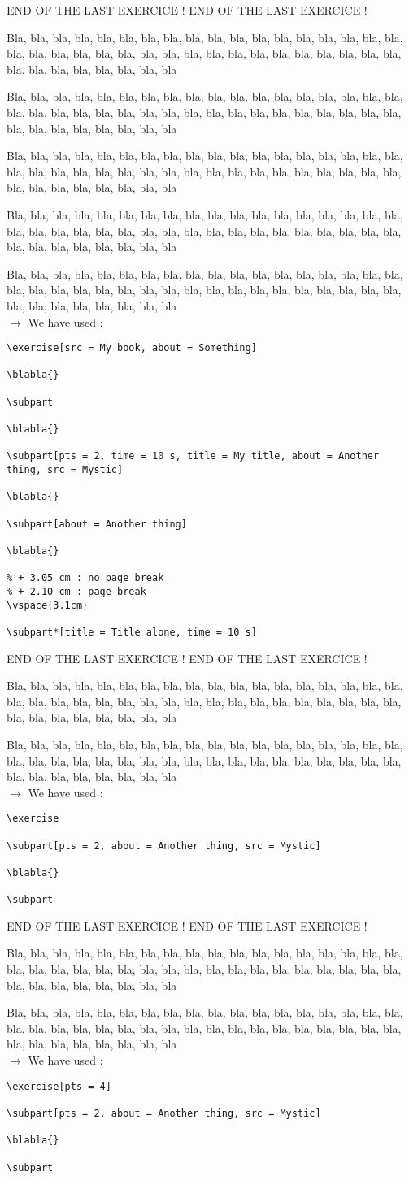 \documentclass[12pt]{article}
\newcommand\blabla{%
		\noindent Bla, bla, bla, bla, bla, bla, bla, bla, bla, bla, bla,
		bla, bla, bla, bla, bla, bla, bla, bla, bla, bla, bla,
		bla, bla, bla, bla, bla, bla, bla, bla, bla, bla, bla,
		bla, bla, bla, bla, bla, bla, bla, bla, bla, bla, bla
	}
\newcommand\codeused{
		\blabla{} \medskip  \\ \noindent $\rightarrow$ We have used :
	}
\begin{document}
\newpage \medskip \noindent END OF THE LAST EXERCICE ! END OF THE LAST EXERCICE !

\exercise[src = My book, about = Something]
      
\blabla{}

\subpart

\blabla{}

\subpart[pts = 2, time = 10 s, title = My title, about = Another thing, src = Mystic]

\blabla{}

\subpart[about = Another thing]

\blabla{}


\subpart*[title = Title alone, time = 10 s]


\codeused{}

\begin{verbatim}
\exercise[src = My book, about = Something]
      
\blabla{}

\subpart

\blabla{}

\subpart[pts = 2, time = 10 s, title = My title, about = Another thing, src = Mystic]

\blabla{}

\subpart[about = Another thing]

\blabla{}

% + 3.05 cm : no page break
% + 2.10 cm : page break
\vspace{3.1cm}

\subpart*[title = Title alone, time = 10 s]\end{verbatim}



\newpage \medskip \noindent END OF THE LAST EXERCICE ! END OF THE LAST EXERCICE !

\exercise
      
\subpart[pts = 2, about = Another thing, src = Mystic]

\blabla{}

\subpart

\codeused{}

\begin{verbatim}
\exercise
      
\subpart[pts = 2, about = Another thing, src = Mystic]

\blabla{}

\subpart
\end{verbatim}



\newpage \medskip \noindent END OF THE LAST EXERCICE ! END OF THE LAST EXERCICE !

\exercise[pts = 4]
      
\subpart[pts = 2, about = Another thing, src = Mystic]

\blabla{}

\subpart

\codeused{}

\begin{verbatim}
\exercise[pts = 4]
      
\subpart[pts = 2, about = Another thing, src = Mystic]

\blabla{}

\subpart
\end{verbatim}
\end{document}
